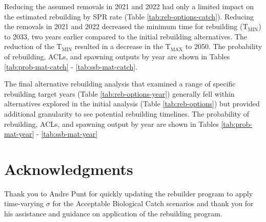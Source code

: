 \documentclass[11pt,
  english,
  a4paper,
]{article}
\begin{document}
\leavevmode\tagmcend\tagstructend\par


Reducing the assumed removals in 2021 and 2022 had only a limited impact on the estimated rebuilding by SPR rate (Table \ref{tab:reb-options-catch}). Reducing the removals in 2021 and 2022 decreased the minimum time for rebuilding ({\(\text{T}_\text{MIN}\)\leavevmode\tagmcend\tagstructend}) to 2033, two years earlier compared to the initial rebuilding alternatives. The reduction of the {\(\text{T}_\text{MIN}\)\leavevmode\tagmcend\tagstructend} resulted in a decrease in the {\(\text{T}_\text{MAX}\)\leavevmode\tagmcend\tagstructend} to 2050. The probability of rebuilding, ACLs, and spawning outputs by year are shown in Tables \ref{tab:prob-mat-catch} - \ref{tab:ssb-mat-catch}.

\leavevmode\tagmcend\tagstructend\par


The final alternative rebuilding analysis that examined a range of specific rebuilding target years (Table \ref{tab:reb-options-year}) generally fell within alternatives explored in the initial analysis (Table \ref{tab:reb-options}) but provided additional granularity to see potential rebuilding timelines. The probability of rebuilding, ACLs, and spawning output by year are shown in Tables \ref{tab:prob-mat-year} - \ref{tab:ssb-mat-year}

\leavevmode\tagmcend\tagstructend\par


\hypertarget{acknowledgments}{%
\section{Acknowledgments}\label{acknowledgments}}

\leavevmode\tagmcend\tagstructend


Thank you to Andre Punt for quickly updating the rebuilder program to apply time-varying {\(\sigma\)\leavevmode\tagmcend\tagstructend} for the Acceptable Biological Catch scenarios and thank you for his assistance and guidance on application of the rebuilding program.
\end{document}
